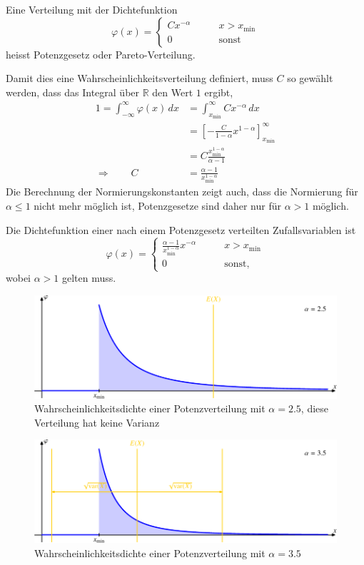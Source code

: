 \begin{definition}
Eine Verteilung mit der Dichtefunktion
\[
\varphi(x)=\begin{cases}
Cx^{-\alpha}&\qquad x>x_{\min}\\
0&\qquad\text{sonst}
\end{cases}
\]
heisst Potenzgesetz oder Pareto-Verteilung.
\end{definition}
Damit dies eine Wahrscheinlichkeitsverteilung definiert, muss $C$
so gewählt werden, dass das Integral über $\mathbb R$ den Wert $1$
ergibt,
\begin{align*}
1=\int_{-\infty}^\infty\varphi(x)\,dx
&=
\int_{x_{\min}}^\infty Cx^{-\alpha}\,dx
\\
&=
\left[-\frac{C}{1-\alpha}x^{1-\alpha}\right]_{x_{\min}}^\infty
\\
&=
C\frac{x_{\min}^{1-\alpha}}{\alpha-1}
\\
\Rightarrow\qquad
C
&=
\frac{\alpha-1}{x_{\min}^{1-\alpha}}
\end{align*}
Die Berechnung der Normierungskonstanten zeigt auch, dass die Normierung
für $\alpha \le 1$ nicht mehr möglich ist, Potenzgesetze sind daher
nur für $\alpha > 1$ möglich.

\begin{satz}
Die Dichtefunktion einer nach einem Potenzgesetz verteilten Zufallsvariablen
ist 
\[
\varphi(x)=\begin{cases}
\displaystyle
\frac{\alpha-1}{x_{\min}^{1-\alpha}}
x^{-\alpha}&\qquad x>x_{\min}
\\
0&\qquad\text{sonst},
\end{cases}
\]
wobei $\alpha>1$ gelten muss.
\end{satz}
\begin{figure}
\centering
\includegraphics{images/power-2.pdf}
\caption{Wahrscheinlichkeitsdichte einer Potenzverteilung mit $\alpha=2.5$,
diese Verteilung hat keine Varianz
\label{pareto-verteilung-2.5}}
\end{figure}
\begin{figure}
\centering
\includegraphics{images/power-3.pdf}
\caption{Wahrscheinlichkeitsdichte einer Potenzverteilung mit $\alpha=3.5$
\label{pareto-verteilung-3.5}}
\end{figure}

